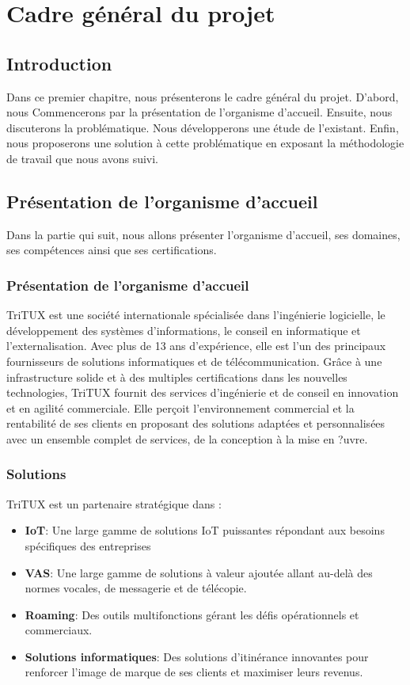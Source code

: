 \chapter{Cadre général du projet}

\section{Introduction}

Dans ce premier chapitre, nous présenterons le cadre général du projet. D'abord, nous
Commencerons  par  la présentation de  l'organisme  d'accueil.  Ensuite, nous  discuterons  la  problématique. Nous développerons
une étude de  l'existant.   Enfin,  nous  proposerons  une  solution  
à  cette  problématique  en  exposant  la  méthodologie  de  travail  que  nous  avons  suivi. 
\section{Présentation de l'organisme d'accueil }
Dans la partie qui suit, nous allons présenter l'organisme d'accueil, ses domaines, ses compétences ainsi que ses certifications.
\subsection{Présentation de l'organisme d'accueil}
TriTUX est une société internationale spécialisée dans l'ingénierie logicielle, le développement des systèmes d'informations, le conseil en informatique et l'externalisation.
Avec plus de 13 ans d'expérience, elle est l'un des principaux fournisseurs de solutions
informatiques et de télécommunication. Grâce à une infrastructure solide et à des multiples
certifications dans les nouvelles technologies, TriTUX fournit des services d'ingénierie et
de conseil en innovation et en agilité commerciale. Elle perçoit l'environnement commercial et la rentabilité de ses clients en proposant des solutions adaptées et personnalisées
avec un ensemble complet de services, de la conception à la mise en ?uvre.

\subsection{Solutions}
TriTUX est un partenaire stratégique dans :
\begin{itemize}
	\item \textbf{IoT}: Une large gamme de solutions IoT puissantes répondant aux besoins spécifiques des entreprises
\item \textbf{VAS}: Une large gamme de solutions à valeur ajoutée allant au-delà des normes
vocales, de messagerie et de télécopie.
\item \textbf{Roaming}: Des outils multifonctions gérant les défis opérationnels et commerciaux.
\item \textbf{Solutions informatiques}: Des solutions d'itinérance innovantes pour renforcer
l'image de marque de ses clients et maximiser leurs revenus.
\end{itemize}
